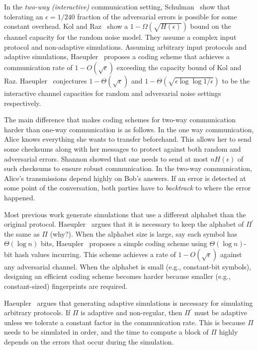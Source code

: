 \documentclass[11pt]{article}
\theoremstyle{plain}
\begin{document}
In the \emph{two-way (interactive) }communication setting, Schulman~\cite{Schulman:1996}
show that tolerating an $\epsilon=1/240$ fraction of the adversarial
errors is possible for some constant overhead. Kol and Raz~\cite{Kol:2013:ICC:2488608.2488699}
show a $1-\Omega(\sqrt{H(\epsilon)})$ bound on the channel capacity
for the random noise model. They assume a complex input protocol and
non-adaptive simulations. Assuming arbitrary input protocols and adaptive
simulations, Haeupler~\cite{DBLP:journals/corr/Haeupler14} proposes
a coding scheme that achieves a communication rate of $1-O(\sqrt{\epsilon})$
exceeding the capacity bound of Kol and Raz. Haeupler~\cite{DBLP:journals/corr/Haeupler14}
conjectures $1-\Theta(\sqrt{\epsilon})$ and $1-\Theta(\sqrt{\epsilon\log\log1/\epsilon})$
to be the interactive channel capacities for random and adversarial
noise settings respectively.

The main difference that makes coding schemes for two-way communication
harder than one-way communication is as follows. In the one way communication,
Alice knows everything she wants to transfer beforehand. This allows
her to send some checksums along with her messages to protect against
both random and adversarial errors. Shannon showed that one needs
to send at most $nH(\epsilon)$ of such checksums to ensure robust
communication. In the two-way communication, Alice's transmissions
depend highly on Bob's answers. If an error is detected at some point
of the conversation, both parties have to \emph{backtrack} to where
the error happened.

Most previous work generate simulations that use a different alphabet
than the original protocol. Haeupler~\cite{DBLP:journals/corr/Haeupler14}
argues that it is necessary to keep the alphabet of $\Pi^{\prime}$
the same as $\Pi$ (why?). When the alphabet size is large, say each
symbol has $\Theta(\log n)$ bits, Haeupler~\cite{DBLP:journals/corr/Haeupler14}
proposes a simple coding scheme using $\Theta(\log n)$-bit hash values
incurring. This scheme achieves a rate of $1-O(\sqrt{\epsilon})$
against any adversarial channel. When the alphabet is small (e.g.,
constant-bit symbols), designing an efficient coding scheme becomes
harder because smaller (e.g., constant-sized) fingerprints are required.

Haeupler~\cite{DBLP:journals/corr/Haeupler14} argues that generating
adaptive simulations is necessary for simulating arbitrary protocols.
If $\Pi$ is adaptive and non-regular, then $\Pi^{\prime}$ must be
adaptive unless we tolerate a constant factor in the communication
rate. This is because $\Pi$ needs to be simulated in order, and the
time to compute a block of $\Pi$ highly depends on the errors that
occur during the simulation.
\end{document}

